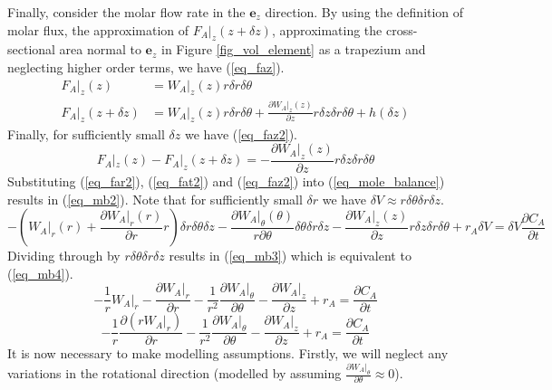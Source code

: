 \documentclass[11pt,fleqn]{article}
\theoremstyle{defstyle}
\begin{document}
Finally, consider the molar flow rate in the $\mathbf{e}_z$ direction. By using the definition of molar flux, the approximation of $F_A|_z(z+\delta z)$, approximating the cross-sectional area normal to $\mathbf{e}_z$ in Figure \ref{fig_vol_element} as a trapezium and neglecting higher order terms, we have (\ref{eq_faz}).
\begin{equation}
\begin{aligned}
F_A|_z(z) &= W_A|_z(z) r \delta r \delta \theta \\
F_A|_z(z + \delta z) &= W_A|_z(z) r \delta r \delta \theta + \frac{\partial W_A|_z(z)}{\partial z}r \delta z \delta r \delta \theta + h(\delta z)
\end{aligned}
\label{eq_faz}
\end{equation}
Finally, for sufficiently small $\delta z$ we have (\ref{eq_faz2}).
\begin{equation}
F_A|_z(z) - F_A|_z(z + \delta z) = - \frac{\partial W_A|_z(z)}{\partial z}r \delta z \delta r \delta \theta
\label{eq_faz2}
\end{equation}
Substituting (\ref{eq_far2}), (\ref{eq_fat2}) and (\ref{eq_faz2}) into (\ref{eq_mole_balance}) results in (\ref{eq_mb2}). Note that for sufficiently small $\delta r$ we have $\delta V \approx r \delta \theta \delta r \delta z$.
\begin{equation}
- (W_ A|_r(r)  + \frac{\partial W_A|_r(r)}{\partial r}r) \delta r \delta \theta \delta z - \frac{\partial W_A|_\theta(\theta)}{r \partial \theta}\delta \theta\delta r \delta z - \frac{\partial W_A|_z(z)}{\partial z}r \delta z \delta r \delta \theta + r_A \delta V = \delta V \frac{\partial C_A}{\partial t}
\label{eq_mb2}
\end{equation}
Dividing through by $r \delta \theta \delta r \delta z$ results in (\ref{eq_mb3}) which is equivalent to (\ref{eq_mb4}).
\begin{equation}
-\frac{1}{r} W_A|_r - \frac{\partial W_A|_r}{\partial r} - \frac{1}{r^2}\frac{\partial W_A|_\theta}{\partial \theta} - \frac{\partial W_A|_z}{\partial z}+ r_A  = \frac{\partial C_A}{\partial t}
\label{eq_mb3}
\end{equation}
\begin{equation}
-\frac{1}{r} \frac{\partial (rW_A|_r)}{\partial r} - \frac{1}{r^2}\frac{\partial W_A|_\theta}{\partial \theta} - \frac{\partial W_A|_z}{\partial z}+ r_A  = \frac{\partial C_A}{\partial t}
\label{eq_mb4}
\end{equation}
It is now necessary to make modelling assumptions. Firstly, we will neglect any variations in the rotational direction (modelled by assuming $\frac{\partial W_A|_\theta}{\partial \theta} \approx 0$).
\end{document}
